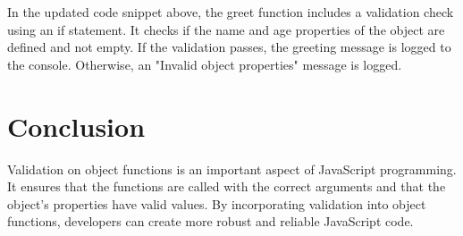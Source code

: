 \documentclass{article}
\begin{document}
In the updated code snippet above, the greet function includes a validation check using an if statement. It checks if the name and age properties of the object are defined and not empty. If the validation passes, the greeting message is logged to the console. Otherwise, an "Invalid object properties" message is logged.

\section{Conclusion}

Validation on object functions is an important aspect of JavaScript programming. It ensures that the functions are called with the correct arguments and that the object's properties have valid values. By incorporating validation into object functions, developers can create more robust and reliable JavaScript code.
\end{document}
